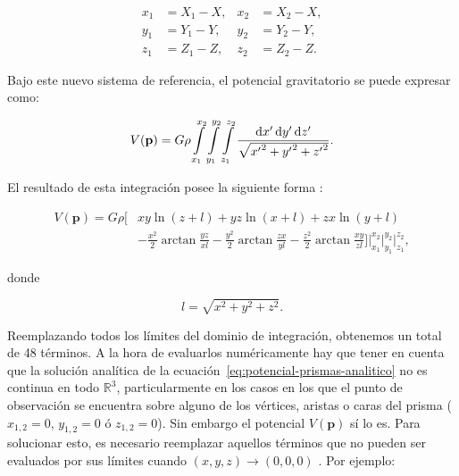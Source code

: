 \begin{equation}
    \begin{aligned}
        x_1 &= X_1 - X, & x_2 &= X_2 - X, \\
        y_1 &= Y_1 - Y, & y_2 &= Y_2 - Y, \\
        z_1 &= Z_1 - Z, & z_2 &= Z_2 - Z.
    \end{aligned}
\end{equation}

Bajo este nuevo sistema de referencia, el potencial gravitatorio se puede
expresar como:

\begin{equation}
    V(\mathbf{p}) =
    G \rho
    \int\limits_{x_1}^{x_2}
    \int\limits_{y_1}^{y_2}
    \int\limits_{z_1}^{z_2}
    \frac{\mathop{}\!\textnormal{d} x' \mathop{}\!\textnormal{d} y' \mathop{}\!\textnormal{d} z'}{\sqrt{{x'}^2 + {y'}^2 + {z'}^2}}.
\end{equation}

El resultado de esta integración posee la siguiente forma
\citep{nagy2000,nagy2002}:

\begin{equation}
    \begin{split}
        V(\mathbf{p}) =
        G \rho
        \Bigg[ &
            xy \ln (z + l) + yz \ln(x + l) + zx \ln(y + l) \\
               &
            - \frac{x^2}{2} \arctan \frac{yz}{xl}
            - \frac{y^2}{2} \arctan \frac{zx}{yl}
            - \frac{z^2}{2} \arctan \frac{xy}{zl}
        \Bigg]
        \Bigg|_{x_1}^{x_2}
        \Bigg|_{y_1}^{y_2}
        \Bigg|_{z_1}^{z_2},
    \end{split}
    \label{eq:potencial-prismas-analitico}
\end{equation}

\noindent donde

\begin{equation}
    l = \sqrt{x^2 + y^2 + z^2}.
\end{equation}

Reemplazando todos los límites del dominio de integración, obtenemos un total
de 48 términos.
A la hora de evaluarlos numéricamente hay que tener en cuenta que la solución
analítica de la ecuación~\ref{eq:potencial-prismas-analitico} no es
continua en todo $\mathbb{R}^3$, particularmente en los casos en los que el
punto de observación se encuentra sobre alguno de los vértices, aristas o caras
del prisma ($x_{1,2}=0$, $y_{1,2}=0$ ó $z_{1,2}=0$). Sin embargo el potencial
$V(\mathbf{p})$ sí lo es.
Para solucionar esto, es necesario reemplazar aquellos términos que no pueden
ser evaluados por sus límites cuando $(x, y, z) \rightarrow (0, 0, 0)$
\citep{nagy2000}.
Por ejemplo:

